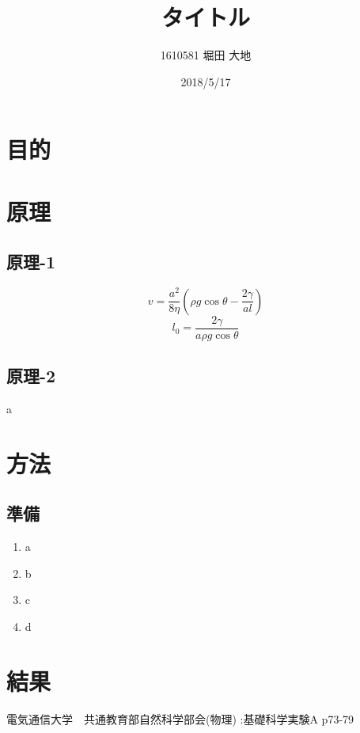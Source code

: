 \documentclass[twocolumn, 10pt,a4j]{jsarticle}
\title{\vspace{-2.5cm}タイトル}
\author{1610581 堀田 大地}
\date{2018/5/17}
\begin{document}
\maketitle{}
\section{目的}
\section{原理}
\subsection{原理-1}
\begin{equation}
v=\dfrac {a^{2}}{8\eta }\left( \rho g\cos \theta -\dfrac {2\gamma }{al}\right) 
\end{equation}
\begin{equation}
l_{0}=\dfrac {2\gamma }{a\rho g\cos \theta }
\end{equation}
\subsection{原理-2}a
\section{方法}
\subsection{準備}
\begin{enumerate}
\item a
\item b
\item c
\item d
\end{enumerate}
\section{結果}
\begin{thebibliography}{3}
\bibitem{}電気通信大学　共通教育部自然科学部会(物理) :基礎科学実験A p73-79
\end{thebibliography}
\end{document}
